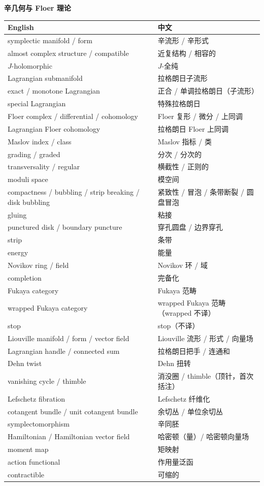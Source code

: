 \vspace{0.6em}
\noindent\textbf{辛几何与 Floer 理论}\par\nobreak
\vspace{0.3em}
{\small
\begin{longtable}{p{}p{}}
\toprule
English & 中文 \\
\midrule
\endhead
symplectic manifold / form & 辛流形 / 辛形式 \\
almost complex structure / compatible & 近复结构 / 相容的 \\
$J$-holomorphic & $J$-全纯 \\
Lagrangian submanifold & 拉格朗日子流形 \\
exact / monotone Lagrangian & 正合 / 单调拉格朗日（子流形） \\
special Lagrangian & 特殊拉格朗日 \\
Floer complex / differential / cohomology & Floer 复形 / 微分 / 上同调 \\
Lagrangian Floer cohomology & 拉格朗日 Floer 上同调 \\
Maslov index / class & Maslov 指标 / 类 \\
grading / graded & 分次 / 分次的 \\
transversality / regular & 横截性 / 正则的 \\
moduli space & 模空间 \\
compactness / bubbling / strip breaking / disk bubbling & 紧致性 / 冒泡 / 条带断裂 / 圆盘冒泡 \\
gluing & 粘接 \\
punctured disk / boundary puncture & 穿孔圆盘 / 边界穿孔 \\
strip & 条带 \\
energy & 能量 \\
Novikov ring / field & Novikov 环 / 域 \\
completion & 完备化 \\
Fukaya category & Fukaya 范畴 \\
wrapped Fukaya category & wrapped Fukaya 范畴（wrapped 不译） \\
stop & stop（不译） \\
Liouville manifold / form / vector field & Liouville 流形 / 形式 / 向量场 \\
Lagrangian handle / connected sum & 拉格朗日把手 / 连通和 \\
Dehn twist & Dehn 扭转 \\
vanishing cycle / thimble & 消没圈 / thimble（顶针，首次括注） \\
Lefschetz fibration & Lefschetz 纤维化 \\
cotangent bundle / unit cotangent bundle & 余切丛 / 单位余切丛 \\
symplectomorphism & 辛同胚 \\
Hamiltonian / Hamiltonian vector field & 哈密顿（量）/ 哈密顿向量场 \\
moment map & 矩映射 \\
action functional & 作用量泛函 \\
contractible & 可缩的 \\
\bottomrule
\end{longtable}}

